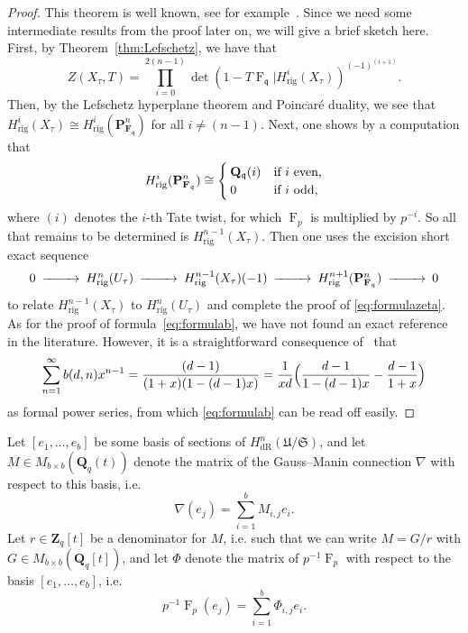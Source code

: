 \documentclass[a4paper,11pt]{article}
\numberwithin{equation}{section}
\newcommand{\ZZ}{\mathbf{Z}} %
\newcommand{\QQ}{\mathbf{Q}} %
\newcommand{\FF}{\mathbf{F}} %
\DeclareMathOperator{\Frob}{F}           %
\providecommand{\HdR}{H_{\text{dR}}}    %
\providecommand{\Hrig}{H_{\text{rig}}}  %
\theoremstyle{definition}
\begin{document}
\begin{proof}
This theorem is well known, see for example~\cite{AbbottKedlayaRoe2006}. 
Since we need some intermediate results from the proof later on, we will 
give a brief sketch here. First, by Theorem~\ref{thm:Lefschetz}, we have that
\[
Z(X_{\tau},T) = \prod_{i=0}^{2(n-1)} \det(1- T \Frob_{\mathfrak{q}} | \Hrig^i(X_{\tau}))^{(-1)^{(i+1)}}.
\]
Then, by the Lefschetz hyperplane theorem and Poincar\'e duality, we see 
that $\Hrig^i(X_{\tau}) \cong \Hrig^i(\mathbf{P}^n_{\FF_{\mathfrak{q}}})$ 
for all $i \neq (n-1)$. Next, one shows by a computation that
\begin{equation} \label{eqn:projcoho}
\Hrig^i(\mathbf{P}^n_{\FF_{\mathfrak{q}}}) 
\cong 
\begin{cases}
\QQ_{\mathfrak{q}}(i) &\mbox{if $i$ even,} \\
$0$ &\mbox{if $i$ odd,} 
\end{cases} 
\end{equation}
where $(i)$ denotes the $i$-th Tate twist, for which $\Frob_p$ is multiplied 
by $p^{-i}$. So all that remains to be determined is $\Hrig^{n-1}(X_{\tau})$. 
Then one uses the excision short exact sequence
\begin{equation} \label{eqn:excision}
\begin{CD}
0 @>>> \Hrig^{n}(U_{\tau}) @>>> \Hrig^{n-1}(X_{\tau})(-1) @>>> \Hrig^{n+1}(\mathbf{P}^n_{\FF_{\mathfrak{q}}}) @>>> 0
\end{CD} 
\end{equation}
to relate $\Hrig^{n-1}(X_{\tau})$ to $\Hrig^{n}(U_{\tau})$ and complete 
the proof of \eqref{eq:formulazeta}. As for the proof of 
formula~\eqref{eq:formulab}, we have not found an exact reference 
in the literature. However, it is a straightforward consequence 
of~\cite[Corollaire 2.4 (i)]{sga7} that 
\[
\sum_{n=1}^{\infty} b(d,n) x^{n-1} = \frac{(d-1)}{(1+x)(1-(d-1)x)} = \frac{1}{xd} \Bigl( \frac{d-1}{1-(d-1)x} - \frac{d-1}{1+x} \Bigr)
\] 
as formal power series, from which \eqref{eq:formulab} can be read off easily.
\end{proof}

Let $[e_1, \ldots, e_b]$ be some basis of sections of 
$\HdR^n(\mathfrak{U}/\mathfrak{S})$, and let $M \in M_{b \times b}(\QQ_q(t))$ 
denote the matrix of the Gauss--Manin connection $\nabla$ with respect 
to this basis, i.e.\ 
\[
\nabla (e_j) = \sum_{i=1}^b M_{i,j} e_i.
\]
Let $r \in \ZZ_q[t]$ be a denominator for $M$, i.e. such that we can write 
$M = G/r$ with $G \in M_{b \times b}(\QQ_q[t])$, and let $\Phi$ denote the 
matrix of $p^{-1}\Frob_p$ with respect to the basis $[e_1, \ldots, e_b]$, i.e.\
\[
p^{-1} \Frob_p (e_j) = \sum_{i=1}^b \Phi_{i,j} e_i.
\]
\end{document}
